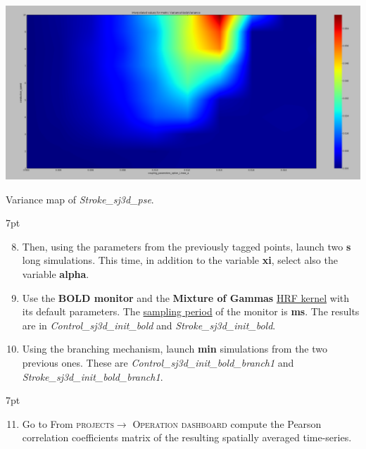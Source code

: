 \documentclass{tufte-handout}
\newenvironment{formal}{%
  \def\FrameCommand{%
    \hspace{1pt}%
    {\color{DarkBlue}\vrule width 2pt}%
    {\color{formalshade}\vrule width 4pt}%
    \colorbox{formalshade}%
  }%
  \MakeFramed{\advance\hsize-\width\FrameRestore}%
  \noindent\hspace{-4.55pt}%
  \begin{adjustwidth}{}{7pt}%
  \vspace{2pt}\vspace{2pt}%
}
{%
  \vspace{2pt}\end{adjustwidth}\endMakeFramed%
}
\newenvironment{simulation}{%
  \def\FrameCommand{%
    \hspace{1pt}%
    {\color{ForestGreen}\vrule width 2pt}%
    {\color{simulationshade}\vrule width 4pt}%
    \colorbox{simulationshade}%
  }%
  \MakeFramed{\advance\hsize-\width\FrameRestore}%
  \noindent\hspace{-4.55pt}%
  \begin{adjustwidth}{}{7pt}%
  \vspace{2pt}\vspace{2pt}%
}
{%
  \vspace{2pt}\end{adjustwidth}\endMakeFramed%
}
\begin{document}
  \begin{marginfigure}
\includegraphics[width=0.82\linewidth]{Handout_UI_ModellingStructuralLesions_StrokeSJ3DPSE}
  \caption{Variance map of \textit{Stroke\_sj3d\_pse}.}
  \label{fig:sj3d_stroke}
\end{marginfigure}


\begin{simulation}
\begin{enumerate}[resume]
\setcounter{enumi}{7}
  \item Then, using the parameters from the previously tagged points, launch two \textbf{\unit[60]{s}} long simulations. This time, in addition to the variable \textbf{xi}, select also the variable \textbf{alpha}.
  \item  Use the \textbf{BOLD monitor} and the \textbf{Mixture of Gammas} \underline{HRF kernel} with its default parameters. The \underline{sampling period} of the monitor is \textbf{\unit[2000]{ms}}. The results are in \textit{Control\_sj3d\_init\_bold} and \textit{Stroke\_sj3d\_init\_bold}.
  \item Using the branching mechanism, launch \textbf{\unit[4]{min}} simulations from the two previous ones. These are \textit{Control\_sj3d\_init\_bold\_branch1} and \textit{Stroke\_sj3d\_init\_bold\_branch1}.
  \end{enumerate}
\end{simulation}

\newpage

\begin{formal}
\begin{enumerate}[resume]
\setcounter{enumi}{10}
\item Go to From \textsc{projects}$\rightarrow$ \textsc{Operation dashboard} compute the Pearson correlation coefficients matrix of the resulting spatially averaged time-series. 
  \end{enumerate}
\end{formal}
\end{document}
